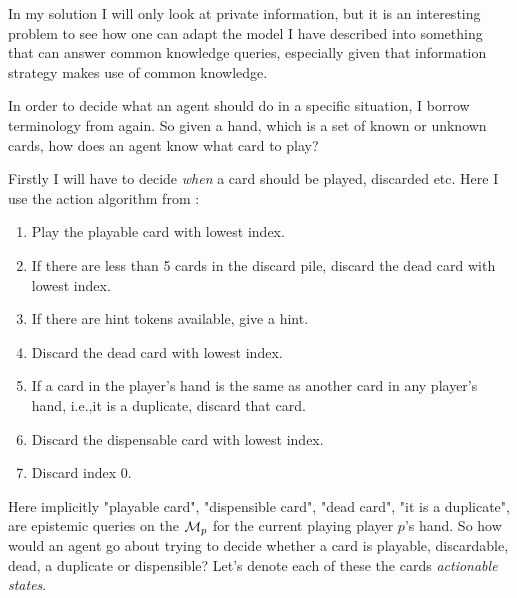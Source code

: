 In my solution I will only look at private information, but it is an interesting problem to see how one can adapt the model I have described into something that can answer common knowledge queries, especially given that \cite{CoxEtAl2015} information strategy makes use of common knowledge.

In order to decide what an agent should do in a specific situation, I borrow terminology from \cite{CoxEtAl2015} again. So given a hand, which is a  set of known or unknown cards, how does an agent know what card to play?





Firstly I will have to decide \emph{when} a card should be played, discarded etc. Here I use the action algorithm from \cite{CoxEtAl2015}:
\begin{enumerate}
	\item Play the playable card with lowest index.
	\item If there are less than 5 cards in the discard pile, discard the dead card with lowest index.
	\item If there are hint tokens available, give a hint.
	\item Discard the dead card with lowest index.
	\item If a card in the player’s hand is the same as another card in any player’s hand, i.e.,it is a duplicate, discard that card.
	\item Discard the dispensable card with lowest index.
	\item Discard index 0.
\end{enumerate}

Here implicitly "playable card", "dispensible card", "dead card", "it is a duplicate", are epistemic queries on the $\mathcal{M}_p$ for the current playing player $p$'s hand. So how would an agent go about trying to decide whether a card is playable, discardable, dead, a duplicate or dispensible? Let's denote each of these the cards \emph{actionable states}.

